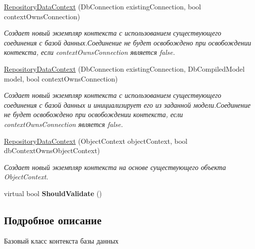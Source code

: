 \begin{DoxyCompactItemize}
\hyperlink{class_security_1_1_entity_dal_1_1_base_1_1_repository_data_context_a99df09b09d77220fe39076a525de2008}{Repository\+Data\+Context} (Db\+Connection existing\+Connection, bool context\+Owns\+Connection)
\begin{DoxyCompactList}\small\item\em Создает новый экземпляр контекста с использованием существующего соединения с базой данных.\+Соединение не будет освобождено при освобождении контекста, если {\itshape context\+Owns\+Connection}  является false. \end{DoxyCompactList}\item 
\hyperlink{class_security_1_1_entity_dal_1_1_base_1_1_repository_data_context_abdd838c185df21475f09e9beca06bb82}{Repository\+Data\+Context} (Db\+Connection existing\+Connection, Db\+Compiled\+Model model, bool context\+Owns\+Connection)
\begin{DoxyCompactList}\small\item\em Создает новый экземпляр контекста с использованием существующего соединения с базой данных и инициализирует его из заданной модели.\+Соединение не будет освобождено при освобождении контекста, если {\itshape context\+Owns\+Connection}  является false. \end{DoxyCompactList}\item 
\hyperlink{class_security_1_1_entity_dal_1_1_base_1_1_repository_data_context_a57c71a0b2e0268654012be65ac1156e5}{Repository\+Data\+Context} (Object\+Context object\+Context, bool db\+Context\+Owns\+Object\+Context)
\begin{DoxyCompactList}\small\item\em Создает новый экземпляр контекста на основе существующего объекта Object\+Context. \end{DoxyCompactList}\item 
\mbox{\label{class_security_1_1_entity_dal_1_1_base_1_1_repository_data_context_a245fe7a39f471745e62faffca1ce6489}} 
virtual bool {\bfseries Should\+Validate} ()
\end{DoxyCompactItemize}


\subsection{Подробное описание}
Базовый класс контекста базы данных 



